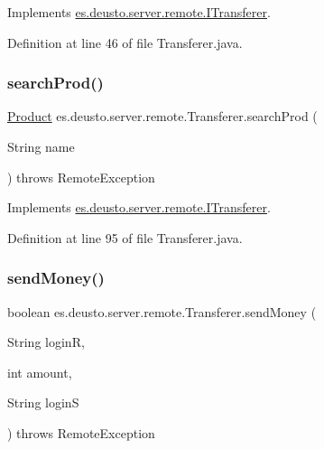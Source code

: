 Implements \hyperlink{interfacees_1_1deusto_1_1server_1_1remote_1_1_i_transferer_ab805207e578865de5bf2e69ca8942344}{es.\+deusto.\+server.\+remote.\+I\+Transferer}.



Definition at line 46 of file Transferer.\+java.

\mbox{\label{classes_1_1deusto_1_1server_1_1remote_1_1_transferer_ad6759f696eddd682b750f92ec41d1fcb}} 
\subsubsection{\texorpdfstring{search\+Prod()}{searchProd()}}
{\footnotesize\ttfamily \hyperlink{classes_1_1deusto_1_1server_1_1db_1_1data_1_1_product}{Product} es.\+deusto.\+server.\+remote.\+Transferer.\+search\+Prod (\begin{DoxyParamCaption}\item[{String}]{name }\end{DoxyParamCaption}) throws Remote\+Exception}



Implements \hyperlink{interfacees_1_1deusto_1_1server_1_1remote_1_1_i_transferer_a1fb33a5447e1647ffde8a01d180b8d99}{es.\+deusto.\+server.\+remote.\+I\+Transferer}.



Definition at line 95 of file Transferer.\+java.

\mbox{\label{classes_1_1deusto_1_1server_1_1remote_1_1_transferer_ad1eb84155ba0c457645f2ad53725320d}} 
\subsubsection{\texorpdfstring{send\+Money()}{sendMoney()}}
{\footnotesize\ttfamily boolean es.\+deusto.\+server.\+remote.\+Transferer.\+send\+Money (\begin{DoxyParamCaption}\item[{String}]{loginR,  }\item[{int}]{amount,  }\item[{String}]{loginS }\end{DoxyParamCaption}) throws Remote\+Exception}



